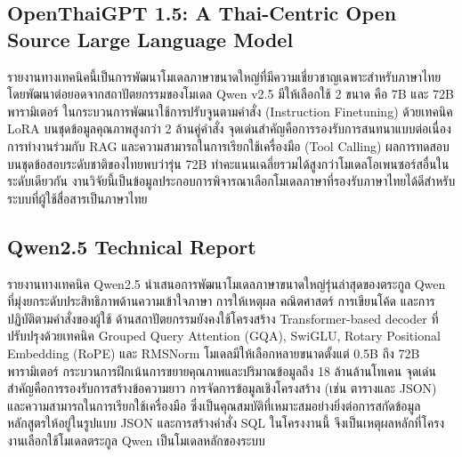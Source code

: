 \subsection{OpenThaiGPT 1.5: A Thai-Centric Open Source Large Language Model \cite{openthaigpt2024}}

รายงานทางเทคนิคนี้เป็นการพัฒนาโมเดลภาษาขนาดใหญ่ที่มีความเชี่ยวชาญเฉพาะสำหรับภาษาไทย โดยพัฒนาต่อยอดจากสถาปัตยกรรมของโมเดล Qwen v2.5 มีให้เลือกใช้ 2 ขนาด คือ 7B และ 72B พารามิเตอร์ ในกระบวนการพัฒนาใช้การปรับจูนตามคำสั่ง (Instruction Finetuning) ด้วยเทคนิค LoRA บนชุดข้อมูลคุณภาพสูงกว่า 2 ล้านคู่คำสั่ง จุดเด่นสำคัญคือการรองรับการสนทนาแบบต่อเนื่อง การทำงานร่วมกับ RAG และความสามารถในการเรียกใช้เครื่องมือ (Tool Calling) ผลการทดสอบบนชุดข้อสอบระดับชาติของไทยพบว่ารุ่น 72B ทำคะแนนเฉลี่ยรวมได้สูงกว่าโมเดลโอเพนซอร์สอื่นในระดับเดียวกัน งานวิจัยนี้เป็นข้อมูลประกอบการพิจารณาเลือกโมเดลภาษาที่รองรับภาษาไทยได้ดีสำหรับระบบที่ผู้ใช้สื่อสารเป็นภาษาไทย

\subsection{Qwen2.5 Technical Report \cite{qwen2025technical}}

รายงานทางเทคนิค Qwen2.5 นำเสนอการพัฒนาโมเดลภาษาขนาดใหญ่รุ่นล่าสุดของตระกูล Qwen ที่มุ่งยกระดับประสิทธิภาพด้านความเข้าใจภาษา การให้เหตุผล คณิตศาสตร์ การเขียนโค้ด และการปฏิบัติตามคำสั่งของผู้ใช้ ด้านสถาปัตยกรรมยังคงใช้โครงสร้าง Transformer-based decoder ที่ปรับปรุงด้วยเทคนิค Grouped Query Attention (GQA), SwiGLU, Rotary Positional Embedding (RoPE) และ RMSNorm โมเดลมีให้เลือกหลายขนาดตั้งแต่ 0.5B ถึง 72B พารามิเตอร์ กระบวนการฝึกเน้นการขยายคุณภาพและปริมาณข้อมูลถึง 18 ล้านล้านโทเคน จุดเด่นสำคัญคือการรองรับการสร้างข้อความยาว การจัดการข้อมูลเชิงโครงสร้าง (เช่น ตารางและ JSON) และความสามารถในการเรียกใช้เครื่องมือ ซึ่งเป็นคุณสมบัติที่เหมาะสมอย่างยิ่งต่อการสกัดข้อมูลหลักสูตรให้อยู่ในรูปแบบ JSON และการสร้างคำสั่ง SQL ในโครงงานนี้ จึงเป็นเหตุผลหลักที่โครงงานเลือกใช้โมเดลตระกูล Qwen เป็นโมเดลหลักของระบบ
